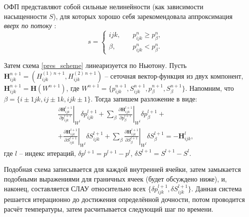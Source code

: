 	ОФП представляют собой сильные нелинейности (как зависимости насыщенности $S$), для которых хорошо себя зарекомендовала аппроксимация \textit{вверх по потоку} \cite{kanevskaya}:
\begin{equation}	
	\label{cond_appr1}
	s = 
	\begin{cases}
		ijk, &\quad p_{ijk}^n \geq p_{\beta}^n,\\
		\beta, &\quad p_{ijk}^n < p_{\beta}^n.
	\end{cases}
\end{equation}

	Затем схема \eqref{pres_scheme} линеаризуется по Ньютону.
	Пусть $\boldsymbol{H}_{ijk}^{n+1} = (H^{(1)\,n+1}_{ijk}, H^{(2)\,n+1}_{ijk})$ -- сеточная вектор-функция из двух компонент, $\boldsymbol{H}_{ijk}^{n+1} = \boldsymbol{H}(W^{n+1})$, где $W^{n+1} = \{p_{ijk}^{n+1}, S_{ijk}^{n+1}, p_{\beta}^{n+1}, S_{\beta}^{n+1}\}$.
	Напомним, что $\beta=\{i\pm 1jk, ij\pm 1k, ijk\pm 1\}$.
	Тогда запишем разложение в виде:
\begin{multline}
	\label{newton}
	\left.\frac{\partial \boldsymbol{H}_{ijk}^{l+1}}{\partial p_{ijk}^{l+1}}\right|_{W^{l}}\delta p_{ijk}^{l+1} + 
	\sum\limits_{\beta}\left.\frac{\partial \boldsymbol{H}_{ijk}^{l+1}}{\partial p_{\beta}^{l+1}}\right|_{W^{l}}\delta p_{\beta}^{l+1} + \\
	+\left.\frac{\partial \boldsymbol{H}_{ijk}^{l+1}}{\partial S_{ijk}^{l+1}}\right|_{W^{l}}\delta S_{ijk}^{l+1} + 
	\sum\limits_{\beta}\left.\frac{\partial \boldsymbol{H}_{ijk}^{l+1}}{\partial S_{\beta}^{l+1}}\right|_{W^{l}}\delta S_{\beta}^{l+1} = -\boldsymbol{H}_{ijk}^l,
\end{multline}
	где $l$ -- индекс итераций,
	$\delta p^{l+1} = p^{l+1}-p^{l}$, $\delta S^{l+1} = S^{l+1}-S^{l}$.

	Подобная схема записывается для каждой внутренней ячейки, затем замыкается подобными выражениями для граничных ячеек (будет обсуждено ниже), и, наконец, составляется СЛАУ относительно всех $\{\delta p_{ijk}^{l+1}, \delta S_{ijk}^{l+1}\}$. Данная система решается итерационно до достижения определённой дочности, потом проводится расчёт температуры, затем расчитывается следующий шаг по времени.

